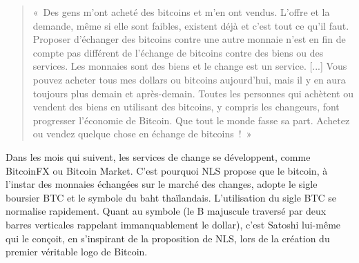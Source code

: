 \begin{quote}
«~Des gens m'ont acheté des bitcoins et m'en ont vendus. L'offre et la demande, même si elle sont faibles, existent déjà et c'est tout ce qu'il faut. Proposer d'échanger des bitcoins contre une autre monnaie n'est en fin de compte pas différent de l'échange de bitcoins contre des biens ou des services. Les monnaies sont des biens et le change est un service. [...] Vous pouvez acheter tous mes dollars ou bitcoins aujourd'hui, mais il y en aura toujours plus demain et après-demain. Toutes les personnes qui achètent ou vendent des biens en utilisant des bitcoins, y compris les changeurs, font progresser l'économie de Bitcoin. Que tout le monde fasse sa part. Achetez ou vendez quelque chose en échange de bitcoins~!~»
\end{quote}

Dans les mois qui suivent, les services de change se développent, comme BitcoinFX ou Bitcoin Market. C'est pourquoi NLS propose que le bitcoin, à l'instar des monnaies échangées sur le marché des changes, adopte le sigle boursier BTC et le symbole du baht thaïlandais. L'utilisation du sigle BTC se normalise rapidement. Quant au symbole (le B majuscule traversé par deux barres verticales rappelant immanquablement le dollar), c'est Satoshi lui-même qui le conçoit, en s'inspirant de la proposition de NLS, lors de la création du premier véritable logo de Bitcoin.

